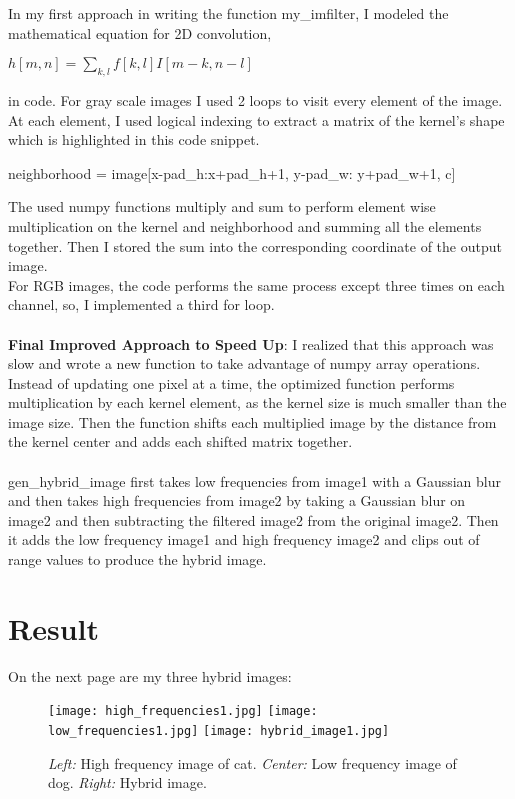 In my first approach in writing the function my\_imfilter, I modeled the mathematical equation for 2D convolution,
\begin{center}
$h[m, n] = \sum_{k,l} f[k,l]I[m-k, n-l]$
\end{center}
in code. For gray scale images I used 2 loops to visit every element of the image. At each element, I used logical indexing to extract a matrix of the kernel's shape which is highlighted in this code snippet.
\begin{python}
neighborhood = image[x-pad_h:x+pad_h+1, y-pad_w: y+pad_w+1, c]
\end{python}
The used numpy functions multiply and sum to perform element wise multiplication on the kernel and neighborhood and summing all the elements together. Then I stored the sum into the corresponding coordinate of the output image.\\
For RGB images, the code performs the same process except three times on each channel, so, I implemented a third for loop. \\\\
\textbf{Final Improved Approach to Speed Up}: I realized that this approach was slow and wrote a new function to take advantage of numpy array operations. Instead of updating one pixel at a time, the optimized function performs multiplication by each kernel element, as the kernel size is much smaller than the image size. Then the function shifts each multiplied image by the distance from the kernel center and adds each shifted matrix together.
\\\\
gen\_hybrid\_image first takes low frequencies from image1 with a Gaussian blur and then takes high frequencies from image2 by taking a Gaussian blur on image2 and then subtracting the filtered image2 from the original image2. Then it adds the low frequency image1 and high frequency image2 and clips out of range values to produce the hybrid image.

\section*{Result}
On the next page are my three hybrid images:

\begin{figure}
    \centering
    \texttt{[image: high\_frequencies1.jpg]}
    \texttt{[image: low\_frequencies1.jpg]}
    \texttt{[image: hybrid\_image1.jpg]}
    \caption{\emph{Left:} High frequency image of cat. \emph{Center:} Low frequency image of dog. \emph{Right:} Hybrid image.}
\end{figure}

